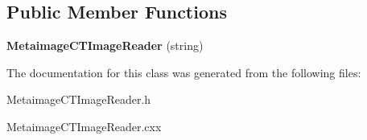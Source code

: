 \subsection*{Public Member Functions}
\begin{DoxyCompactItemize}
\item 
\hypertarget{class_metaimage_c_t_image_reader_a1222b58b583cac68b222b72ffd65cb40}{
{\bfseries MetaimageCTImageReader} (string)}
\label{class_metaimage_c_t_image_reader_a1222b58b583cac68b222b72ffd65cb40}

\end{DoxyCompactItemize}


The documentation for this class was generated from the following files:\begin{DoxyCompactItemize}
\item 
MetaimageCTImageReader.h\item 
MetaimageCTImageReader.cxx\end{DoxyCompactItemize}
